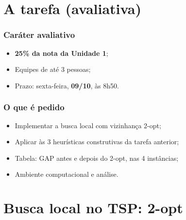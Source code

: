 \documentclass[fleqn]{beamer}
\begin{document}
\section{A tarefa (avaliativa)}

\begin{frame}
	\frametitle{Caráter avaliativo}
	\begin{itemize}
		\item \textbf{25\% da nota da Unidade 1};
		\item Equipes de até 3 pessoas;
		\item Prazo: sexta-feira, \textbf{09/10}, às 8h50.
	\end{itemize}
\end{frame}

\begin{frame}
	\frametitle{O que é pedido}
	\begin{itemize}
		\item Implementar a busca local com vizinhança 2-opt;
		\item Aplicar às 3 heurísticas construtivas da tarefa anterior;
		\item Tabela: GAP antes e depois do 2-opt, nas 4 instâncias;
		\item Ambiente computacional e análise.
	\end{itemize}
\end{frame}

\section{Busca local no TSP: 2-opt}
\end{document}
